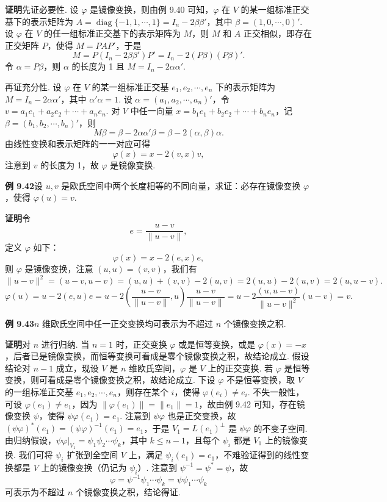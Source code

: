 \documentclass[UTF8, 12pt, fontset=fandol, oneside]{ctexart}
\begin{document}
\noindent\textbf{证明}\quad 先证必要性. 设 $\varphi$ 是镜像变换，则由例 9.40 可知，$\varphi$ 在 $V$ 的某一组标准正交基下的表示矩阵为 $A=\operatorname{diag}\{-1,1,\cdots,1\}=I_n-2\beta\beta'$，其中 $\beta=(1,0,\cdots,0)'$. 设 $\varphi$ 在 $V$ 的任一组标准正交基下的表示矩阵为 $M$，则 $M$ 和 $A$ 正交相似，即存在正交矩阵 $P$，使得 $M=PAP'$，于是
\[
M=P(I_n-2\beta\beta')P'=I_n-2(P\beta)(P\beta)'.
\]
令 $\alpha=P\beta$，则 $\alpha$ 的长度为 1 且 $M=I_n-2\alpha\alpha'$.

再证充分性. 设 $\varphi$ 在 $V$ 的某一组标准正交基 $e_1,e_2,\cdots,e_n$ 下的表示矩阵为
$M=I_n-2\alpha\alpha'$，其中 $\alpha'\alpha=1$. 设 $\alpha=(a_1,a_2,\cdots,a_n)'$，令 $v=a_1e_1+a_2e_2+\cdots+a_ne_n$. 对 $V$ 中任一向量 $x=b_1e_1+b_2e_2+\cdots+b_ne_n$，记 $\beta=(b_1,b_2,\cdots,b_n)'$，则
\[
M\beta=\beta-2\alpha\alpha'\beta=\beta-2(\alpha,\beta)\alpha.
\]
由线性变换和表示矩阵的一一对应可得
\[
\varphi(x)=x-2(v,x)v,
\]
注意到 $v$ 的长度为 1，故 $\varphi$ 是镜像变换.

\noindent\textbf{例 9.42}\quad 设 $u,v$ 是欧氏空间中两个长度相等的不同向量，求证：必存在镜像变换 $\varphi$，使得 $\varphi(u)=v$.

\noindent\textbf{证明}\quad 令
\[
e=\frac{u-v}{\|u-v\|},
\]
定义 $\varphi$ 如下：
\[
\varphi(x)=x-2(e,x)e,
\]
则 $\varphi$ 是镜像变换，注意 $(u,u)=(v,v)$，我们有
\[
\|u-v\|^2=(u-v,u-v)=(u,u)+(v,v)-2(u,v)=2(u,u)-2(u,v)=2(u,u-v).
\]
\[
\varphi(u)=u-2(e,u)e
=u-2\left(\frac{u-v}{\|u-v\|},u\right)\frac{u-v}{\|u-v\|}
=u-2\frac{(u,u-v)}{\|u-v\|^2}(u-v)=v.
\]

\noindent\textbf{例 9.43}\quad $n$ 维欧氏空间中任一正交变换均可表示为不超过 $n$ 个镜像变换之积.

\noindent\textbf{证明}\quad 对 $n$ 进行归纳. 当 $n=1$ 时，正交变换 $\varphi$ 或是恒等变换，或是 $\varphi(x)=-x$，后者已是镜像变换，而恒等变换可看成是零个镜像变换之积，故结论成立. 假设结论对 $n-1$ 成立，现设 $V$ 是 $n$ 维欧氏空间，$\varphi$ 是 $V$ 上的正交变换. 若 $\varphi$ 是恒等变换，则可看成是零个镜像变换之积，故结论成立. 下设 $\varphi$ 不是恒等变换，取 $V$ 的一组标准正交基 $e_1,e_2,\cdots,e_n$，则存在某个 $i$，使得 $\varphi(e_i)\ne e_i$. 不失一般性，可设 $\varphi(e_1)\ne e_1$，因为 $\|\varphi(e_1)\|=\|e_1\|=1$，故由例 9.42 可知，存在镜像变换 $\psi$，使得 $\psi\varphi(e_1)=e_1$. 注意到 $\psi\varphi$ 也是正交变换，故 $(\psi\varphi)^*(e_1)=(\psi\varphi)^{-1}(e_1)=e_1$，于是 $V_1=L(e_1)^\perp$ 是 $\psi\varphi$ 的不变子空间. 由归纳假设，$\psi\varphi|_{V_1}=\psi_1\psi_2\cdots\psi_k$，其中 $k\le n-1$，且每个 $\psi_i$ 都是 $V_1$ 上的镜像变换. 我们可将 $\psi_i$ 扩张到全空间 $V$ 上，满足 $\psi_i(e_1)=e_1$，不难验证得到的线性变换都是 $V$ 上的镜像变换（仍记为 $\psi_i$）. 注意到 $\psi^{-1}=\psi^*=\psi$，故
\[
\varphi=\psi^{-1}\psi_1\cdots\psi_k=\psi\psi_1\cdots\psi_k
\]
可表示为不超过 $n$ 个镜像变换之积，结论得证.
\end{document}
